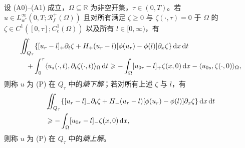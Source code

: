 ﻿\documentclass[../../main.tex]{subfiles}%
\begin{document}
\begin{definition}\label{definition:ch07-上下解}
设 (A0)--(A1) 成立，$\Omega\subseteq\mathbb{R}$ 为非空开集，$\tau\in(0,T)$。若 $u\in L^\infty_{w^*}(0,T;\mathscr{R}_f^+(\Omega))$ 且对所有满足 $\zeta\geqslant0$ 与 $\zeta(\cdot,\tau)=0$ 于 $\Omega$ 的 $\zeta\in C^1([0,\tau];C_c^1(\Omega))$ 以及所有 $l\in[0,\infty)$，有
\begin{align}
&\iint_{Q_\tau}\{[u_r-l]_+\partial_t\zeta+H_+(u_r-l)[\phi(u_r)-\phi(l)]\partial_x\zeta\}\,\mathrm{d}x\,\mathrm{d}t\notag\\
&\quad+\int_0^\tau\langle u_s(\cdot,t),\partial_t\zeta(\cdot,t)\rangle_\Omega\,\mathrm{d}t
\geqslant-\int_\Omega[u_{0r}-l]_+\zeta(x,0)\,\mathrm{d}x
-\langle u_{0s},\zeta(\cdot,0)\rangle_\Omega, \label{align:ch07-7.9}
\end{align}
则称 $u$ 为 (P) 在 $Q_\tau$ 中的\emph{熵下解}；若对所有上述 $\zeta$ 与 $l$，有
\begin{align}
&\iint_{Q_\tau}\{[u_r-l]_-\partial_t\zeta+H_-(u_r-l)[\phi(u_r)-\phi(l)]\partial_x\zeta\}\,\mathrm{d}x\,\mathrm{d}t\notag\\
&\geqslant-\int_\Omega[u_{0r}-l]_-\zeta(x,0)\,\mathrm{d}x, \label{align:ch07-7.10}
\end{align}
则称 $u$ 为 (P) 在 $Q_\tau$ 中的\emph{熵上解}。
\end{definition}
\end{document}

